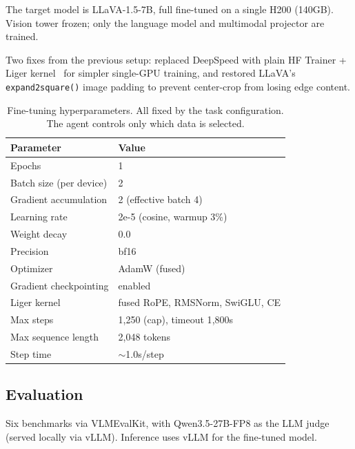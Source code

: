 The target model is LLaVA-1.5-7B, full fine-tuned on a single H200 (140GB). Vision tower frozen; only the language model and multimodal projector are trained.

Two fixes from the previous setup: replaced DeepSpeed with plain HF Trainer + Liger kernel~\cite{hsu2024liger} for simpler single-GPU training, and restored LLaVA's \texttt{expand2square()} image padding to prevent center-crop from losing edge content.

\begin{table}[H]
\centering
\small
\caption{Fine-tuning hyperparameters. All fixed by the task configuration. The agent controls only which data is selected.}
\label{tab:finetune-config}
\begin{tabular}{ll}
\toprule
\textbf{Parameter} & \textbf{Value} \\
\midrule
Epochs & 1 \\
Batch size (per device) & 2 \\
Gradient accumulation & 2 (effective batch 4) \\
Learning rate & 2e-5 (cosine, warmup 3\%) \\
Weight decay & 0.0 \\
Precision & bf16 \\
Optimizer & AdamW (fused) \\
Gradient checkpointing & enabled \\
Liger kernel & fused RoPE, RMSNorm, SwiGLU, CE \\
Max steps & 1{,}250 (cap), timeout 1{,}800s \\
Max sequence length & 2{,}048 tokens \\
Step time & $\sim$1.0s/step \\
\bottomrule
\end{tabular}
\end{table}

\subsection{Evaluation}

Six benchmarks via VLMEvalKit, with Qwen3.5-27B-FP8 as the LLM judge (served locally via vLLM). Inference uses vLLM for the fine-tuned model.

